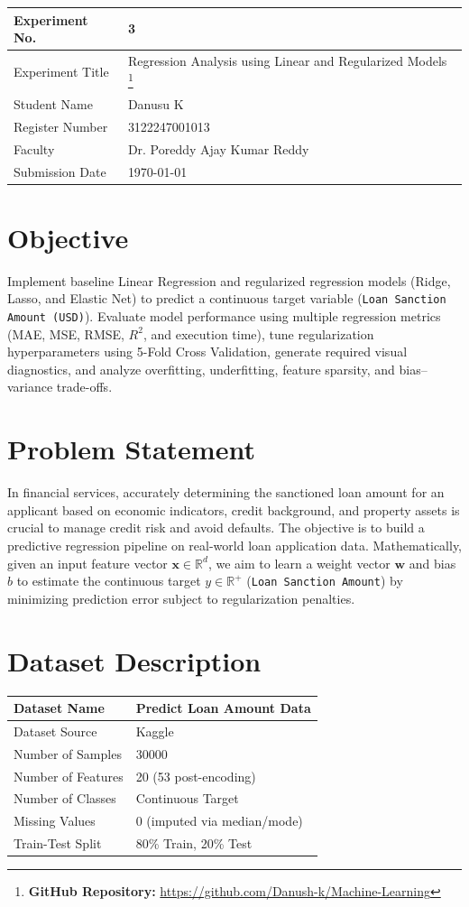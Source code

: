 \documentclass[12pt,a4paper]{article}
\begin{document}
\begin{tabular}{|p{4cm}|p{11cm}|}
\hline
Experiment No. & 3 \\ \hline
Experiment Title & Regression Analysis using Linear and Regularized Models
\footnote{\textbf{GitHub Repository: }\url{https://github.com/Danush-k/Machine-Learning}}\\ \hline
Student Name & Danusu K \\ \hline
Register Number & 3122247001013 \\ \hline
Faculty & Dr. Poreddy Ajay Kumar Reddy \\ \hline
Submission Date & \today \\ \hline
\end{tabular}

\section{Objective}
Implement baseline Linear Regression and regularized regression models (Ridge, Lasso, and Elastic Net) to predict a continuous target variable (\texttt{Loan Sanction Amount (USD)}). Evaluate model performance using multiple regression metrics (MAE, MSE, RMSE, $R^2$, and execution time), tune regularization hyperparameters using 5-Fold Cross Validation, generate required visual diagnostics, and analyze overfitting, underfitting, feature sparsity, and bias--variance trade-offs.

\section{Problem Statement}
In financial services, accurately determining the sanctioned loan amount for an applicant based on economic indicators, credit background, and property assets is crucial to manage credit risk and avoid defaults. The objective is to build a predictive regression pipeline on real-world loan application data. Mathematically, given an input feature vector $\mathbf{x} \in \mathbb{R}^d$, we aim to learn a weight vector $\mathbf{w}$ and bias $b$ to estimate the continuous target $y \in \mathbb{R}^+$ (\texttt{Loan Sanction Amount}) by minimizing prediction error subject to regularization penalties.

\section{Dataset Description}
\begin{longtable}{|p{6cm}|p{8cm}|}
\hline
Dataset Name & Predict Loan Amount Data \\ \hline
Dataset Source & Kaggle \\ \hline
Number of Samples & 30000 \\ \hline
Number of Features & 20 (53 post-encoding) \\ \hline
Number of Classes & Continuous Target \\ \hline
Missing Values & 0 (imputed via median/mode) \\ \hline
Train-Test Split & 80\% Train, 20\% Test \\ \hline
\end{longtable}
\end{document}
